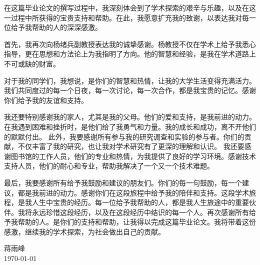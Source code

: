 在这篇毕业论文的撰写过程中，我深刻体会到了学术探索的艰辛与乐趣，以及在这一过程中所获得的宝贵支持和帮助。在此，我愿意扩充我的致谢，以表达我对每一位给予我帮助的人的深深感激。

首先，我再次向杨绪兵副教授表达我的诚挚感谢。杨教授不仅在学术上给予我悉心指导，更在思想和方法论上为我指明了方向。他的智慧和经验，是我在学术道路上不可或缺的财富。

对于我的同学们，我想说，是你们的智慧和热情，让我的大学生活变得充满活力。我们共同度过的每一个日夜，每一次讨论，每一次合作，都是我宝贵的记忆。感谢你们给予我的友谊和支持。

我还要特别感谢我的家人，尤其是我的父母。他们的爱和支持，是我前进的动力。在我遇到困难和挫折时，是他们给了我勇气和力量。我的成长和成功，离不开他们的默默付出。
此外，我要感谢所有参与我的研究调查和实验的参与者。你们的贡献，不仅丰富了我的研究，也让我对学术研究有了更深的理解和认识。
我还要感谢图书馆的工作人员，他们的专业和热情，为我提供了良好的学习环境。感谢技术支持人员，他们的耐心和专业，帮助我解决了一个又一个技术难题。

最后，我要感谢所有给予我鼓励和建议的朋友们。你们的每一句鼓励，每一个建议，都是我前进的动力。感谢你们在这段旅程中给予我的陪伴和支持。这段学术旅程，是我人生中宝贵的经历。每一位给予我帮助的人，都是我人生旅途中的重要伙伴。我将永远珍惜这段经历，以及在这段经历中结识的每一个人。再次感谢所有给予我帮助的人。是你们的支持和帮助，让我得以完成这篇毕业论文。我将带着这份感激，继续我的学术探索，为社会做出自己的贡献。
\begin{flushright}
  蒋雨峰 \\
  \today
\end{flushright}
